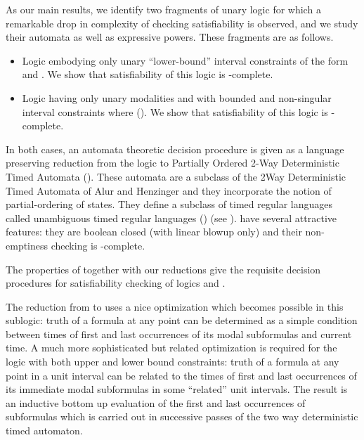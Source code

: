 \documentclass{llncs}
\newcommand{\oomit}[1]{}
\newcommand{\bmitlfp}{\mbox{}}
\newcommand{\potdta}{\mbox{}}
\newcommand{\mitlfpinf}{\mbox{}}
\newcommand{\mitlfpb}{\bmitlfp}
\newcommand{\nexptime}{\mbox{}}
\newcommand{\conp}{\mbox{}}
\newcommand{\np}{\mbox{}}
\newcommand{\tul}{\mbox{}}
\begin{document}
As our main results, we identify two fragments of unary logic  for which a remarkable drop in complexity of checking satisfiability is observed, and we study their automata as well as expressive powers. These fragments are as follows.
\begin{itemize} 
\item  Logic  embodying only unary ``lower-bound'' interval constraints of the form  and . We show that satisfiability of this logic is \np-complete.
\item Logic  having only unary modalities  and  with bounded and non-singular interval constraints  where ().
We show that satisfiability of this logic is \nexptime-complete.
\end{itemize}
In both cases, an automata theoretic decision procedure is given as a language preserving reduction from the logic  to  Partially Ordered 2-Way Deterministic Timed Automata (\potdta). These automata are a subclass of the 
2Way Deterministic Timed Automata  of Alur and Henzinger \cite{AH92} and they incorporate the notion of partial-ordering of states. 
They define a subclass of timed regular languages called unambiguous timed regular languages (\tul) (see \cite{PS10}).
\potdta\/ have several attractive features: they are boolean closed (with linear blowup only) and  their non-emptiness checking is \np-complete.
\oomit{ The
\potdta\/ have several attractive features: they are boolean closed and each boolean operation gives rise to linear blowup in their size.
Moreover,  their non-emptiness is NP-complete and language containment is \conp-complete  \cite{PS10}.
}
The  properties of \potdta\/ together with our reductions give the requisite decision procedures for satisfiability checking of logics \mitlfpinf\/ and \mitlfpb. \oomit{Both the reductions rely upon a novel scheme of  clocking (freezing) the times of first and last occurrences of subformulas in a pre-determined finite set of time intervals  to evaluate the truth of the formula. This can be done in  an inductive, bottom up fashion in successive passes of the two way automaton. 
}

The reduction from  to \potdta\/ uses a nice optimization which becomes possible in this sublogic: truth of a formula at any point can be determined as a simple condition between times of first and last occurrences of its modal subformulas and current time. A much more sophisticated but related optimization is required for the logic  with both upper and lower bound constraints: truth of a formula at any point in a unit interval can be related to the times of first and last occurrences  of its immediate modal subformulas in some ``related'' unit intervals. The result is an inductive bottom up evaluation of the first and last occurrences of subformulas which is carried out in successive passes of the two way deterministic timed automaton.
\end{document}
